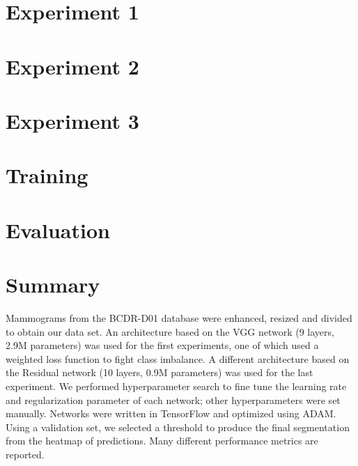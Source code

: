 \section{Experiment 1}
\label{sec:Experiment1}


\section{Experiment 2}
\label{sec:Experiment2}


\section{Experiment 3}
\label{sec:Experiment3}


\section{Training}


\section{Evaluation}


\section{Summary}
Mammograms from the BCDR-D01 database were enhanced, resized and divided to obtain our data set. An architecture based on the VGG network (9 layers, 2.9M parameters) was used for the first experiments, one of which used a weighted loss function to fight class imbalance. A different architecture based on the Residual network (10 layers, 0.9M parameters) was used for the last experiment. We performed hyperparameter search to fine tune the learning rate and regularization parameter of each network; other hyperparameters were set manually. Networks were written in TensorFlow and optimized using ADAM. Using a validation set, we selected a threshold to produce the final segmentation from the heatmap of predictions. Many different performance metrics are reported.
